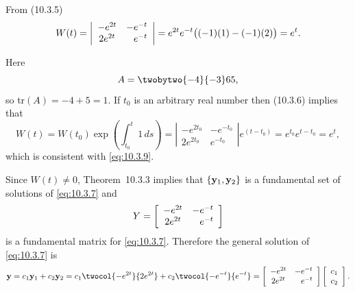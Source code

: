 \begin{examplesolution}
 From \textup{(10.3.5)}
\begin{equation}
  \label{eq:10.3.9}W(t)=\left|
  \begin{array}{cc}
    -e^{2t} & -e^{-t}       \\
    2e^{2t} & \hfill e^{-t}
  \end{array}\right|= e^{2t}e^{-t}\bigl((-1)(1)-(-1)(2)\bigr)=e^{t}.
\end{equation}

 Here
\[
  A=\twobytwo{-4}{-3}65,
\]
so tr$(A)=-4+5=1$. If $t_{0}$ is an arbitrary real number then \textup{(10.3.6)} implies that
\[
  W(t)=W(t_{0})\exp{\left(\int_{t_{0}}^{t}1\,ds\right)}= \left|
  \begin{array}{cc}
    -e^{2t_{0}} & -e^{-t_{0}} \\
    2e^{2t_{0}} & e^{-t_{0}}
  \end{array}\right|e^{(t-t_{0})}=e^{t_{0}}e^{t-t_{0}}=e^{t},
\]
which is consistent with \eqref{eq:10.3.9}.

 Since $W(t)\ne0$, Theorem~10.3.3 implies that
$\{{\bf y}_{1},{\bf y}_{2}\}$ is a fundamental set of solutions of \eqref{eq:10.3.7} and
\[
  Y=\left[
  \begin{array}{cc}
    -e^{2t} & -e^{-t}       \\
    2e^{2t} & \hfill e^{-t}
  \end{array}\right]
\]
is a fundamental matrix for \eqref{eq:10.3.7}. Therefore the general solution of \eqref{eq:10.3.7}
is
\begin{equation}
  \label{eq:10.3.10}{\bf y}=c_{1}{\bf y}_{1}+c_{2}{\bf y}_{2}= c_{1}\twocol{-e^{2t}}{2e^{2t}}+c_{2}\twocol{-e^{-t}}{e^{-t}}=\left[
  \begin{array}{cc}
    -e^{2t} & -e^{-t}       \\
    2e^{2t} & \hfill e^{-t}
  \end{array}\right] \left[
  \begin{array}{c}
    c_{1} \\
    c_{2}
  \end{array}\right].
\end{equation}


\end{examplesolution}
